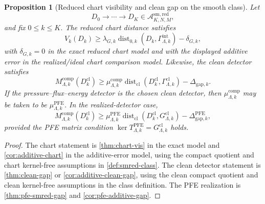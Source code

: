 \documentclass[11pt]{article}
\numberwithin{equation}{section}
\theoremstyle{plain}
\newtheorem{proposition}[theorem]{Proposition}
\theoremstyle{definition}
\theoremstyle{remark}
\newcommand{\cl}{\mathrm{cl}}
\newcommand{\intg}{\mathrm{int}}
\newcommand{\comp}{\mathrm{comp}}
\newcommand{\gap}{\mathrm{gap}}
\newcommand{\Dist}{\operatorname{dist}}
\newcommand{\A}{\mathcal A}
\begin{document}
\begin{proposition}[Reduced chart visibility and clean gap on the smooth class]\label{prop:smred-chart-gap}
Let
\[
  D_0\to\cdots\to D_K\in\A_{K,N,M}^{\mathrm{sm,red}},
\]
and fix \(0\le k\le K\).  The reduced chart distance satisfies
\[
  V_k(D_k)
  \ge
  \lambda_{G,k}\Dist_{0,k}(D_k,\Gamma_{\Lambda,k}^{\intg})
  -
  \delta_{G,k},
\]
with \(\delta_{G,k}=0\) in the exact reduced chart model and with the
displayed additive error in the realized/ideal chart comparison model.
Likewise, the clean detector satisfies
\[
  M_{\Lambda,k}^{\comp}(D_k^{\cl})
  \ge
  \mu_{\Lambda,k}^{\comp}
  \Dist_{\cl}(D_k^{\cl},\Gamma_{\Lambda,k}^{\cl})
  -
  \Delta_{\gap,k}.
\]
If the pressure--flux--energy detector is the chosen clean detector, then
\(\mu_{\Lambda,k}^{\comp}\) may be taken to be
\(\mu_{\Lambda,k}^{\mathrm{PFE}}\).  In the realized-detector case,
\[
  M_{\Lambda,k}^{\comp}(D_k^{\cl})
  \ge
  \mu_{\Lambda,k}^{\mathrm{PFE}}
  \Dist_{\cl}(D_k^{\cl},G_{\Lambda,k}^{\cl})
  -
  \Delta_{\gap,k}^{\mathrm{PFE}},
\]
provided the PFE matrix condition
\(\ker T_{\Lambda,k}^{\mathrm{PFE}}=G_{\Lambda,k}^{\cl}\) holds.
\end{proposition}

\begin{proof}
The chart statement is \cref{thm:chart-vis} in the exact model and
\cref{cor:additive-chart} in the additive-error model, using the compact
quotient and chart kernel-free assumptions in \cref{def:smred-class}.  The
clean detector statement is \cref{thm:clean-gap} or
\cref{cor:additive-clean-gap}, using the clean compact quotient and clean
kernel-free assumptions in the class definition.  The PFE realization is
\cref{thm:pfe-smred-gap} and \cref{cor:pfe-additive-gap}.
\end{proof}
\end{document}
